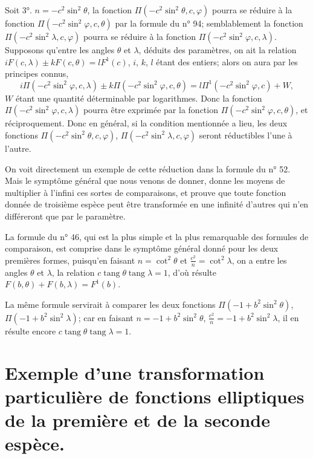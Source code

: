 \documentclass{article}
\begin{document}
Soit 3°. $n=-c^{2}\sin^{2}\theta$, la fonction $\Pi(-c^{2}\sin^{2}\theta,c,\varphi)$ pourra se réduire à la fonction $\Pi(-c^{2}\sin^{2}\varphi,c,\theta)$ par la formule du n° 94; semblablement la fonction $\Pi(-c^{2}\sin^{2}\lambda,c,\varphi)$ pourra se réduire à la fonction $\Pi(-c^{2}\sin^{2}\varphi,c,\lambda)$. Supposons qu'entre les angles $\theta$ et $\lambda$, déduits des paramètres, on ait la relation $iF(c,\lambda)\pm kF(c,\theta)=lF^{1}(c)$, $i$, $k$, $l$ étant des entiers; alors on aura par les principes connus,
\[ i\Pi(-c^{2}\sin^{2}\varphi,c,\lambda)\pm k\Pi(-c^{2}\sin^{2}\varphi,c,\theta)=l\Pi^{1}(-c^{2}\sin^{2}\varphi,c)+W, \]
$W$ étant une quantité déterminable par logarithmes. Donc la fonction $\Pi(-c^{2}\sin^{2}\varphi,c,\lambda)$ pourra être exprimée par la fonction $\Pi(-c^{2}\sin^{2}\varphi,c,\theta)$, et réciproquement. Donc en général, si la condition mentionnée a lieu, les deux fonctions $\Pi(-c^{2}\sin^{2}\theta,c,\varphi)$, $\Pi(-c^{2}\sin^{2}\lambda,c,\varphi)$ seront réductibles l'une à l'autre.

On voit directement un exemple de cette réduction dans la formule du n° 52. Mais le symptôme général que nous venons de donner, donne les moyens de multiplier à l'infini ces sortes de comparaisons, et prouve que toute fonction donnée de troisième espèce peut être transformée en une infinité d'autres qui n'en différeront que par le paramètre.


La formule du n° 46, qui est la plus simple et la plus remarquable des formules de comparaison, est comprise dans le symptôme général donné pour les deux premières formes, puisqu'en faisant $n=\cot^{2}\theta$ et $\frac{c^{2}}{n}=\cot^{2}\lambda$, on a entre les angles $\theta$ et $\lambda$, la relation $c\operatorname{tang}\theta\operatorname{tang}\lambda=1$, d'où résulte $F(b,\theta)+F(b,\lambda)=F^{1}(b)$.

La même formule servirait à comparer les deux fonctions $\Pi(-1+b^{2}\sin^{2}\theta)$, $\Pi(-1+b^{2}\sin^{2}\lambda)$; car en faisant $n=-1+b^{2}\sin^{2}\theta$, $\frac{c^{2}}{n}=-1+b^{2}\sin^{2}\lambda$, il en résulte encore $c\operatorname{tang}\theta\operatorname{tang}\lambda=1$.

\section*{Exemple d'une transformation particulière de fonctions elliptiques de la première et de la seconde espèce.}
\end{document}
